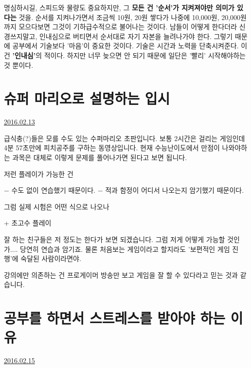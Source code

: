 명심하시길, 스피드와 물량도 중요하지만, 그 \textbf{모든 건 '순서'가 지켜져야만 의미가 있다는} 것을.
순서를 지켜나가면서 조금씩 10원, 20원 쌓다가 나중에 10,000원, 20,000원까지 모으다보면 그것이 기하급수적으로 불어나는 것이다.
남들이 어떻게 한다더라 신경쓰지말고, 인내심으로 버티면서 순서대로 자기 자본을 늘려나가야 한다.
그렇기 때문에 공부에서 기술보다 '마음'이 중요한 것이다. 기술은 시간과 노력을 단축시켜준다. 이건 \textbf{'인내심'}의 적이다.
하지만 너무 늦으면 안 되기 때문에 일단은 '빨리' 시작해야하는 것 뿐이다.
\vspace{5mm}


\section{슈퍼 마리오로 설명하는 입시}
\href{https://www.kockoc.com/Apoc/633676}{2016.02.13}

\vspace{5mm}

급식충(?)들은 모를 수도 있는 수퍼마리오 초판입니다.
보통 2시간은 걸리는 게임인데 4분 57초만에 피치공주를 구하는 동영상입니다.
현재 수능난이도에서 만점이 나와야하는 과목은 대체로 이렇게 문제를 풀어나가면 된다고 보면 됩니다.
\vspace{5mm}

저런 플레이가 가능한 건
\vspace{5mm}

$-$ 수도 없이 연습했기 때문이다.
$-$ 적과 함정이 어디서 나오는지 암기했기 때문이다.
\vspace{5mm}

그럼 실제 시험은 어떤 식으로 나오나
\vspace{5mm}

+ 초고수 플레이
\vspace{5mm}

잘 하는 친구들은 저 정도는 한다가 보면 되겠습니다.
그럼 저게 어떻게 가능할 것인가.... 당연히 연습과 암기죠.
물론 처음보는 게임이라고 할지라도 '보편적인 게임 진행'에 숙달된 사람이라면야.
\vspace{5mm}

강의에만 의존하는 건 프로게이머 방송만 보고 게임을 잘 할 수 있다라고 믿는 것과 같습니다.
\vspace{5mm}





\section{공부를 하면서 스트레스를 받아야 하는 이유}
\href{https://www.kockoc.com/Apoc/636254}{2016.02.15}

